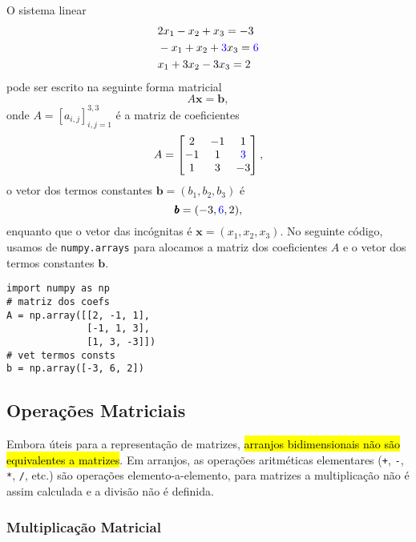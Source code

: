 \begin{ex}\label{cap_arr_sec_mat:ex:sislin}
  O sistema linear
  \begin{subequations}
    \begin{align}
      &2x_1 - x_2 + x_3 = -3\\
      &-x_1 + x_2 + {\color{blue}3}x_3 = {\color{blue}6}\\
      &x_1 + 3x_2 - 3x_3 = 2
    \end{align}
  \end{subequations}
  pode ser escrito na seguinte forma matricial
  \begin{equation}
    A\pmb{x} = \pmb{b},
  \end{equation}
  onde $A = [a_{i,j}]_{i,j=1}^{3,3}$ é a matriz de coeficientes
  \begin{equation}
    A =
    \begin{bmatrix}
      2 & -1 & 1\\
      -1 & 1 & {\color{blue}3}\\
      1 & 3 & -3
    \end{bmatrix},
  \end{equation}
  o vetor dos termos constantes $\pmb{b} = (b_1, b_2, b_3)$ é
  \begin{equation}
    \pmb{b} = (-3, {\color{blue}6}, 2),
  \end{equation}
  enquanto que o vetor das incógnitas é $\pmb{x} = (x_1, x_2, x_3)$. No seguinte código, usamos de \lstinline+numpy.arrays+ para alocamos a matriz dos coeficientes $A$ e o vetor dos termos constantes $\pmb{b}$.
\begin{lstlisting}
import numpy as np
# matriz dos coefs
A = np.array([[2, -1, 1],
              [-1, 1, 3],
              [1, 3, -3]])
# vet termos consts
b = np.array([-3, 6, 2])
\end{lstlisting}
\end{ex}

\subsection{Operações Matriciais}

Embora úteis para a representação de matrizes, \hl{arranjos bidimensionais não são equivalentes a matrizes}. Em arranjos, as operações aritméticas elementares (\lstinline!+!, \lstinline!-!, \lstinline!*!, \lstinline!/!, etc.) são operações elemento-a-elemento, para matrizes a multiplicação não é assim calculada e a divisão não é definida.

\subsubsection{Multiplicação Matricial}

